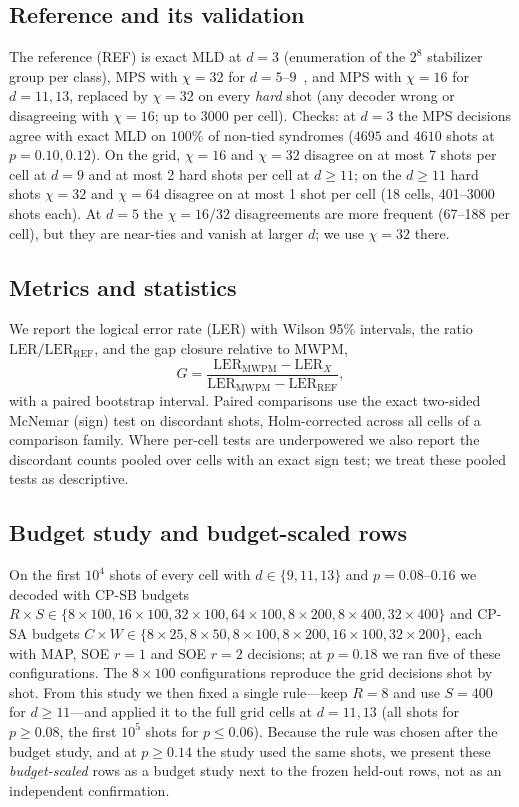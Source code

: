 \documentclass[journal]{IEEEtran}
\newcommand{\REF}{\mathrm{REF}}
\newcommand{\LER}{\mathrm{LER}}
\begin{document}
\subsection{Reference and its validation}
The reference (REF) is exact MLD at $d=3$ (enumeration of the $2^8$ stabilizer group per class), MPS with $\chi=32$ for $d=5$--$9$~\cite{bravyi2014,qecsim}, and MPS with $\chi=16$ for $d=11,13$, replaced by $\chi=32$ on every \emph{hard} shot (any decoder wrong or disagreeing with $\chi=16$; up to 3000 per cell). Checks: at $d=3$ the MPS decisions agree with exact MLD on $100\%$ of non-tied syndromes ($4695$ and $4610$ shots at $p=0.10,0.12$). On the grid, $\chi=16$ and $\chi=32$ disagree on at most 7 shots per cell at $d=9$ and at most 2 hard shots per cell at $d\ge11$; on the $d\ge11$ hard shots $\chi=32$ and $\chi=64$ disagree on at most 1 shot per cell (18 cells, 401--3000 shots each). At $d=5$ the $\chi=16/32$ disagreements are more frequent (67--188 per cell), but they are near-ties and vanish at larger $d$; we use $\chi=32$ there.

\subsection{Metrics and statistics}
We report the logical error rate (LER) with Wilson 95\% intervals, the ratio $\LER/\LER_\REF$, and the gap closure relative to MWPM,
\begin{equation}
G=\frac{\LER_{\mathrm{MWPM}}-\LER_X}{\LER_{\mathrm{MWPM}}-\LER_\REF},
\end{equation}
with a paired bootstrap interval. Paired comparisons use the exact two-sided McNemar (sign) test on discordant shots, Holm-corrected across all cells of a comparison family. Where per-cell tests are underpowered we also report the discordant counts pooled over cells with an exact sign test; we treat these pooled tests as descriptive.

\subsection{Budget study and budget-scaled rows}
\label{sec:budgetprotocol}
On the first $10^4$ shots of every cell with $d\in\{9,11,13\}$ and $p=0.08$--$0.16$ we decoded with CP-SB budgets $R\times S\in\{8\times100,16\times100,32\times100,64\times100,8\times200,8\times400,32\times400\}$ and CP-SA budgets $C\times W\in\{8\times25,8\times50,8\times100,8\times200,16\times100,32\times200\}$, each with MAP, SOE $r=1$ and SOE $r=2$ decisions; at $p=0.18$ we ran five of these configurations. The $8\times100$ configurations reproduce the grid decisions shot by shot. From this study we then fixed a single rule---keep $R=8$ and use $S=400$ for $d\ge11$---and applied it to the full grid cells at $d=11,13$ (all shots for $p\ge0.08$, the first $10^5$ shots for $p\le0.06$). Because the rule was chosen after the budget study, and at $p\ge0.14$ the study used the same shots, we present these \emph{budget-scaled} rows as a budget study next to the frozen held-out rows, not as an independent confirmation.
\end{document}
